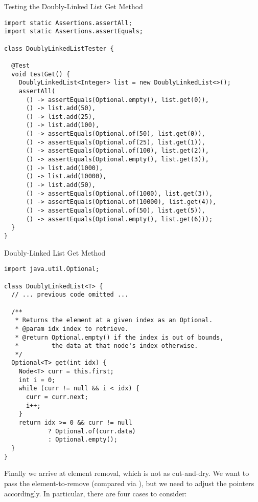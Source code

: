 \begin{cl}[]{Testing the Doubly-Linked List Get Method}
\begin{lstlisting}[language=MyJava]
import static Assertions.assertAll;
import static Assertions.assertEquals;

class DoublyLinkedListTester {

  @Test
  void testGet() {
    DoublyLinkedList<Integer> list = new DoublyLinkedList<>();
    assertAll(
      () -> assertEquals(Optional.empty(), list.get(0)),
      () -> list.add(50),
      () -> list.add(25),
      () -> list.add(100),
      () -> assertEquals(Optional.of(50), list.get(0)),
      () -> assertEquals(Optional.of(25), list.get(1)),
      () -> assertEquals(Optional.of(100), list.get(2)),
      () -> assertEquals(Optional.empty(), list.get(3)),
      () -> list.add(1000),
      () -> list.add(10000),
      () -> list.add(50),
      () -> assertEquals(Optional.of(1000), list.get(3)),
      () -> assertEquals(Optional.of(10000), list.get(4)),
      () -> assertEquals(Optional.of(50), list.get(5)),
      () -> assertEquals(Optional.empty(), list.get(6)));
  }
}
\end{lstlisting}
\end{cl}

\begin{cl}[]{Doubly-Linked List Get Method}
\begin{lstlisting}[language=MyJava]
import java.util.Optional;

class DoublyLinkedList<T> {
  // ... previous code omitted ...

  /**
   * Returns the element at a given index as an Optional.
   * @param idx index to retrieve.
   * @return Optional.empty() if the index is out of bounds,
   *         the data at that node's index otherwise.
   */
  Optional<T> get(int idx) {
    Node<T> curr = this.first;
    int i = 0;
    while (curr != null && i < idx) {
      curr = curr.next;
      i++;
    }
    return idx >= 0 && curr != null
            ? Optional.of(curr.data)
            : Optional.empty();
  }
}
\end{lstlisting}
\end{cl}

Finally we arrive at element removal, which is not as cut-and-dry. We want to pass the element-to-remove (compared via ), but we need to adjust the pointers accordingly. In particular, there are four cases to consider:

